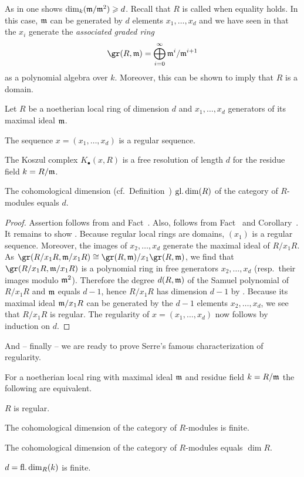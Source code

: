 \documentclass[a4paper,parskip=half,numbers=enddot, DIV=12]{scrreprt}
\renewcommand{\geq}{\geqslant}
\begin{document}
As in \cite[Proposition~1.3.1]{alg2} one shows $\dim_k(\mm/\mm^2)\geq d$. Recall that $R$ is called  when equality holds. In this case, $\mathfrak{m}$ can be generated by $d$ elements $x_1,\ldots,x_d$ and we have seen in \cite[Corollary~3.4.9]{alg2} that the $x_i$ generate the \emph{associated graded ring}
\begin{align*}
	\gr(R,\mm)=\bigoplus_{i=0}^\infty\mm^i/\mm^{i+1}
\end{align*}
as a polynomial algebra over $k$. Moreover, this can be shown to imply that $R$ is a domain.
\begin{prop}
	Let $R$ be a noetherian local ring of dimension $d$ and $x_1,\ldots,x_d$ generators of its maximal ideal $\mathfrak{m}$.
	\begin{alphanumerate}
		\item The sequence $x=(x_1,\ldots,x_d)$ is a regular sequence.
		\item The Koszul complex $K_\bullet(x,R)$ is a free resolution of length $d$ for the residue field $k=R/\mathfrak{m}$.
		\item The cohomological dimension (cf.\ Definition~) $\operatorname{gl.dim}(R)$ of the category of $R$-modules equals $d$.
	\end{alphanumerate}
\end{prop}
\begin{proof}
	Assertion  follows from  and Fact~. Also,  follows from Fact~ and Corollary~. It remains to show . Because regular local rings are domains, $(x_1)$ is a regular sequence. Moreover, the images of $x_2,\ldots,x_d$ generate the maximal ideal of $R/x_1R$. As $\gr(R/x_1R,\mm/x_1R)\cong \gr(R,\mm)/x_1\gr(R,\mm)$, we find that $\gr(R/x_1R,\mm/x_1R)$ is a polynomial ring in free generators $x_2,\ldots,x_d$ (resp.\ their images modulo $\mathfrak{m}^2$). Therefore the degree $d(R,\mathfrak{m})$ of the Samuel polynomial of $R/x_1R$ and $\mathfrak{m}$ equals $d-1$, hence $R/x_1R$ has dimension $d-1$ by \cite[Theorem~20]{alg2}. Because its maximal ideal $\mathfrak{m}/x_1R$ can be generated by the $d-1$ elements $x_2,\ldots,x_d$, we see that $R/x_1R$ is regular. The regularity of $x=(x_1,\ldots,x_d)$ now follows by induction on $d$.
\end{proof}
And -- finally -- we are ready to prove Serre's famous characterization of regularity.
\begin{thm}[Serre]
	For a noetherian local ring with maximal ideal $\mathfrak{m}$ and residue field $k=R/\mathfrak{m}$ the following are equivalent.
	\begin{alphanumerate}
		\item $R$ is regular.
		\item The cohomological dimension of the category of $R$-modules is finite.
		\item The cohomological dimension of the category of $R$-modules equals $\dim R$.
		\item $d=\operatorname{fl.dim}_R(k)$ is finite.
	\end{alphanumerate}
\end{thm}
\end{document}

